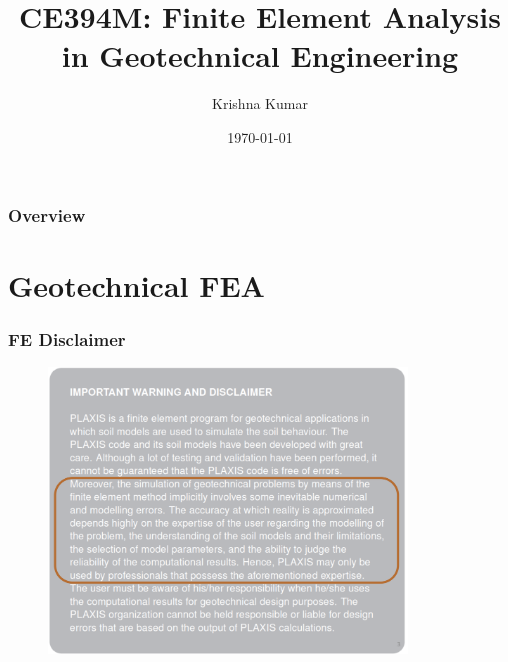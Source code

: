 \documentclass[notes]{beamer}
\title[CE394M: FEM Geo - case-study]{CE394M: Finite Element Analysis in Geotechnical Engineering}
\author{Krishna Kumar} %
\institute[UT Austin] %
{
University of Texas at Austin \\
\medskip
\textit{
  \url{krishnak@utexas.edu}} %
}
\date{\today} %
\begin{document}
\begin{frame}
\titlepage %
\end{frame}

\begin{frame}
 \frametitle{Overview}
 \tableofcontents
\end{frame}

\section{Geotechnical FEA}
\begin{frame}
\frametitle{FE Disclaimer}
\begin{figure}[ht]
	\centering
	\includegraphics[width=0.85\textwidth]{figs/plaxis-disclaimer.png}
\end{figure}
\end{frame}
\end{document}

